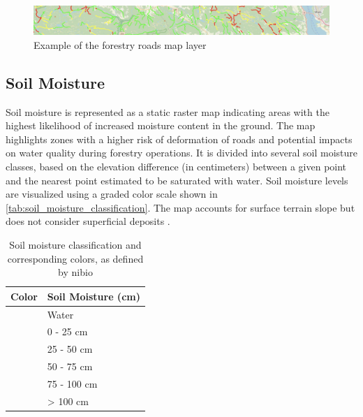 \begin{figure}[h]
    \centering
    \includegraphics[width=1\linewidth]{images/maplayers/forestryroad.png}
    \caption{Example of the forestry roads map layer}
    \label{fig:maplayer:forestryroads}
\end{figure}

\subsection{Soil Moisture}

Soil moisture is represented as a static raster map indicating areas with the highest likelihood of increased moisture content in the ground. The map highlights zones with a higher risk of deformation of roads and potential impacts on water quality during forestry operations. It is divided into several soil moisture classes, based on the elevation difference (in centimeters) between a given point and the nearest point estimated to be saturated with water. Soil moisture levels are visualized using a graded color scale shown in \autoref{tab:soil_moisture_classification}. The map accounts for surface terrain slope but does not consider superficial deposits \cite{geonorge_soil_moisture}.

\begin{table}[h]
    \centering
    \begin{tabular}{|l|l|}
        \hline  
        \textbf{Color} & \textbf{Soil Moisture (cm)} \\
        \hline
        \cellcolor[HTML]{000080} & Water \\
        \hline
        \cellcolor[HTML]{0000ff} & 0 - 25 cm \\
        \hline
        \cellcolor[HTML]{1e90ff} & 25 - 50 cm \\
        \hline
        \cellcolor[HTML]{00bfff} & 50 - 75 cm \\
        \hline
        \cellcolor[HTML]{87cefa} & 75 - 100 cm \\
        \hline
        \cellcolor[HTML]{ffffff} & > 100 cm \\
        \hline
    \end{tabular}
    \caption[Soil moisture classification and corresponding colors]{Soil moisture classification and corresponding colors, as defined by \acrshort{nibio} \cite{geonorge_soil_moisture}}
    \label{tab:soil_moisture_classification}
\end{table}


